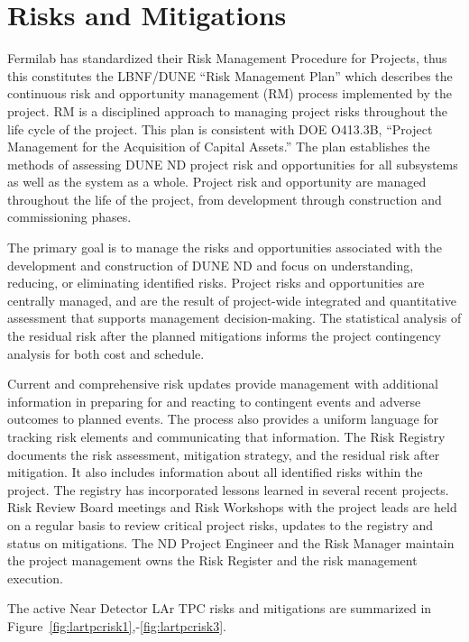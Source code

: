 \section{Risks and Mitigations}
\label{sec:lartpc-risks}

Fermilab has standardized their Risk Management Procedure for Projects, thus this constitutes the LBNF/DUNE “Risk Management Plan” which describes the continuous risk and opportunity management (RM) process implemented by the project.  RM is a disciplined approach to managing project risks throughout the life cycle of the project.  This plan is consistent with DOE O413.3B, “Project Management for the Acquisition of Capital Assets.”  The plan establishes the methods of assessing DUNE ND project risk and opportunities for all subsystems as well as the system as a whole. Project risk and opportunity are managed throughout the life of the project, from development through construction and commissioning phases.

The primary goal is to manage the risks and opportunities associated with the development and construction of DUNE ND and focus on understanding, reducing, or eliminating identified risks. Project risks and opportunities are centrally managed, and are the result of project-wide integrated and quantitative assessment that supports management decision-making. The statistical analysis of the residual risk after the planned mitigations informs the project contingency analysis for both cost and schedule.

Current and comprehensive risk updates provide management with additional information in preparing for and reacting to contingent events and adverse outcomes to planned events. The process also provides a uniform language for tracking risk elements and communicating that information. The Risk Registry documents the risk assessment, mitigation strategy, and the residual risk after mitigation.  It also includes information about all identified risks within the project.  The registry has incorporated lessons learned in several recent projects. Risk Review Board meetings and Risk Workshops with the project leads are held on a regular basis to review critical project risks, updates to the registry and status on mitigations. The ND Project Engineer and the Risk Manager maintain the project management owns the Risk Register and the risk management execution.

The active Near Detector LAr TPC risks and mitigations are summarized in Figure~\ref{fig:lartpcrisk1},-\ref{fig:lartpcrisk3}.

